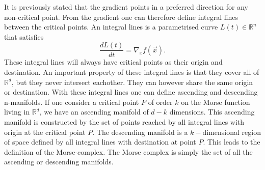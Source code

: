 It is previously stated that the gradient points in a preferred direction for any non-critical
point. From the gradient one can therefore define integral lines between the critical
points. An integral lines is a parametrised curve $L(t)\in\mathbb{R}^n$ that satisfies
\begin{equation}
    \frac{dL(t)}{dt}=\nabla_xf(\vec{x}).
\end{equation}
These integral lines will always have critical points as their origin and
destination. An important property of these integral lines is that they cover
all of $\mathbb{R}^d$, but they never intersect eachother. They can however
share the same origin or destination. With these integral lines one can define
ascending and descending n-manifolds. If one consider a critical point $P$ of
order $k$ on the Morse function living in $\mathbb{R}^d$, we have an ascending manifold of
$d-k$ dimensions. This ascending manifold is constructed by the set of points reached by
all integral lines with origin at the critical point $P$. The descending
manifold is a $k-$dimensional region of space defined by all integral lines with
destination at point $P$. This leads to the definition of the Morse-complex.
The Morse complex is simply the set of all the ascending or descending
manifolds.\\
